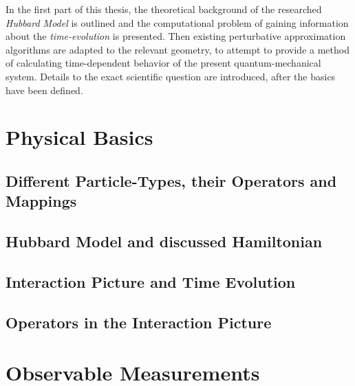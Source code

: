 \documentclass[
headings=optiontohead,              %
12pt,                               %
DIV=13,                             %
twoside=false,                      %
open=right,                         %
BCOR=00mm,                          %
toc=bibliographynumbered            %
]{scrreport}
\begin{document}
In the first part of this thesis, the theoretical background of the researched \emph{Hubbard Model} is outlined and the computational problem of gaining information about the \emph{time-evolution} is presented.
Then existing perturbative approximation algorithms are adapted to the relevant geometry, to attempt to provide a method of calculating time-dependent behavior of the present quantum-mechanical system.
Details to the exact scientific question are introduced, after the basics have been defined.

    \section{Physical Basics}
    \label{sec:theory-physics}
    
    \FloatBarrier
        \subsection{Different Particle-Types, their Operators and Mappings}
        \label{sec:particles}
        
        \FloatBarrier

        \subsection{Hubbard Model and discussed Hamiltonian}
        \label{sec:theory-hubbard-hamiltonian}
        
        \FloatBarrier

        
        \subsection{Interaction Picture and Time Evolution}
        \label{sec:theory-interaction-picture}
        
        \FloatBarrier
        
        \subsection{Operators in the Interaction Picture}
        \label{sec:theory-approximation-evaluation}
        
        \FloatBarrier

    \section{Observable Measurements}
    \label{sec:theory-observables}
    
    \FloatBarrier
\end{document}
